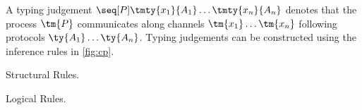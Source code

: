 \begin{definition}\label{def:cp-typing}
  A typing judgement $\seq[{ P }]{\tmty{x_1}{A_1}\dots\tmty{x_n}{A_n}}$ denotes
  that the process $\tm{P}$ communicates along channels $\tm{x_1}\dots\tm{x_n}$
  following protocols $\ty{A_1}\dots\ty{A_n}$. 
  Typing judgements can be constructed using the inference rules in
  \cref{fig:cp}.
\end{definition}
\begin{figure*}[!htb]
  Structural Rules.
  \begin{center} \cpInfAx     \cpInfCut      \end{center}\vspace*{1\baselineskip}

  Logical Rules.
  \begin{center} \cpInfTens   \cpInfParr     \end{center}\vspace*{1\baselineskip}
  \begin{center} \cpInfOne    \cpInfBot      \end{center}\vspace*{1\baselineskip}
  \begin{center}       \end{center}\vspace*{1\baselineskip}
  \begin{center} \cpInfWith                  \end{center}\vspace*{1\baselineskip}
  \begin{center} \cpInfNil    \cpInfTop      \end{center}

  \caption{Classical Processes}
  \label{fig:cp}
\end{figure*}
